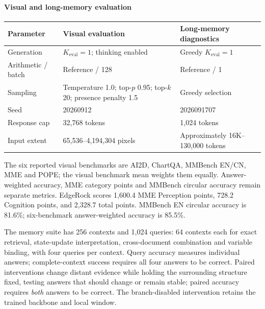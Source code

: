 \paragraph{Visual and long-memory evaluation}
\begin{table}[!htbp]
\small
\begin{tabularx}{\textwidth}{@{}p{3.1cm}X X@{}}
\toprule
Parameter & Visual evaluation & Long-memory diagnostics\\
\midrule
Generation & $K_{\mathrm{eval}}=1$; thinking enabled & Greedy $K_{\mathrm{eval}}=1$\\
Arithmetic / batch & Reference / 128 & Reference / 1\\
Sampling & Temperature 1.0; top-$p$ 0.95; top-$k$ 20; presence penalty 1.5 & Greedy selection\\
Seed & 20260912 & 2026091707\\
Response cap & 32,768 tokens & 1,024 tokens\\
Input extent & 65,536--4,194,304 pixels & Approximately 16K--130,000 tokens\\
\bottomrule
\end{tabularx}
\end{table}

The six reported visual benchmarks are AI2D, ChartQA, MMBench EN/CN, MME and POPE; the visual benchmark mean weights them equally. Answer-weighted accuracy, MME category points and MMBench circular accuracy remain separate metrics. EdgeRock scores 1,600.4 MME Perception points, 728.2 Cognition points, and 2,328.7 total points. MMBench EN circular accuracy is 81.6\%; six-benchmark answer-weighted accuracy is 85.5\%.

The memory suite has 256 contexts and 1,024 queries: 64 contexts each for exact retrieval, state-update interpretation, cross-document combination and variable binding, with four queries per context. Query accuracy measures individual answers; complete-context success requires all four answers to be correct. Paired interventions change distant evidence while holding the surrounding structure fixed, testing answers that should change or remain stable; paired accuracy requires \emph{both} answers to be correct. The branch-disabled intervention retains the trained backbone and local window.

